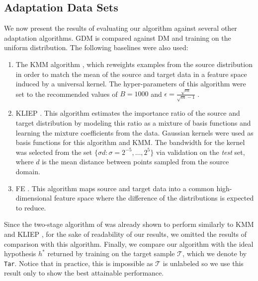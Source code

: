 \documentclass[twoside,11pt]{article}
\newcommand{\cT}{{\mathcal T}}
\newcommand{\1}{\mat{1}}
\begin{document}
\subsection{Adaptation Data Sets}

We now present the results of evaluating our algorithm against several
other adaptation algorithms. GDM is compared against DM and training
on the uniform distribution. The following baselines were also
used:

\begin{enumerate}
\itemsep 0em
 \item The KMM algorithm
\citep{HuangSmolaGrettonBorgwardtScholkopf2006}, which reweights
examples from the source distribution in order to match the mean of
the source and target data in a feature space induced by a universal
kernel. The hyper-parameters of this algorithm were set to the
recommended values of $B = 1000$ and
$\epsilon = \frac{\sqrt{m}}{\sqrt{m} - 1}$ .
\item KLIEP \citep{SugiyamaNakajimaKashimaVonBunauKawanabe2008}. This
algorithm estimates the importance ratio of the source and target
distribution by modeling this ratio as a mixture of basis functions
and learning the mixture coefficients from the data. Gaussian kernels
were used as basis functions for this algorithm and KMM. The bandwidth
for the kernel was selected from the set $\big \{\sigma d \colon
\sigma = 2^{-5} , \ldots, 2^5 \big\}$ via validation on the
\emph{test} set, where $d$ is the mean distance between points sampled
from the source domain.
\item FE \citep{daume2007frustratingly}. This algorithm maps source
and target data into a common high-dimensional feature space where the
difference of the distributions is expected to reduce.
\end{enumerate}

Since the two-stage algorithm of \cite{BickelBrucknerScheffer2007} was
already shown to perform similarly to KMM and KLIEP
\citep{CortesMohri2013}, for the sake of readability of our results,
we omitted the results of comparison with this algorithm. Finally, we
compare our algorithm with the ideal hypothesis $h^*$ returned by training
on the target sample $\cT$, which we denote by {\tt Tar}. Notice that
in practice, this is impossible as $\cT$ is unlabeled so we use this
result only to show the best attainable performance.
\end{document}
